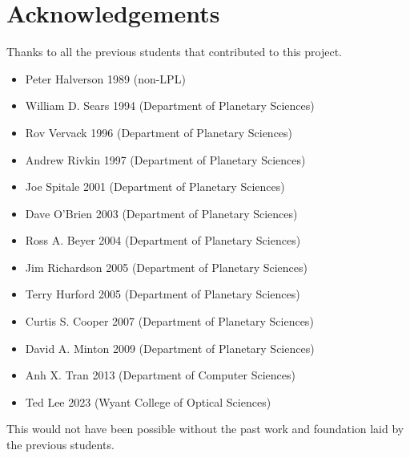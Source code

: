 \chapter{Acknowledgements}
Thanks to all the previous students that contributed to this project.

\begin{itemize}
    \item Peter Halverson	1989 (non-LPL)
    \item William D. Sears	1994 (Department of Planetary Sciences)
    \item Rov Vervack		1996 (Department of Planetary Sciences)
    \item Andrew Rivkin	1997 (Department of Planetary Sciences)
    \item Joe Spitale		2001 (Department of Planetary Sciences)
    \item Dave O'Brien		2003 (Department of Planetary Sciences)
    \item Ross A. Beyer	2004 (Department of Planetary Sciences)
    \item Jim Richardson	2005 (Department of Planetary Sciences)
    \item Terry Hurford	2005 (Department of Planetary Sciences)
    \item Curtis S. Cooper	2007 (Department of Planetary Sciences)
    \item David A. Minton  2009 (Department of Planetary Sciences)
    \item Anh X. Tran		2013 (Department of Computer Sciences)
    \item Ted Lee		2023 (Wyant College of Optical Sciences)
\end{itemize}

This would not have been possible without the past work and foundation laid by the previous students.
